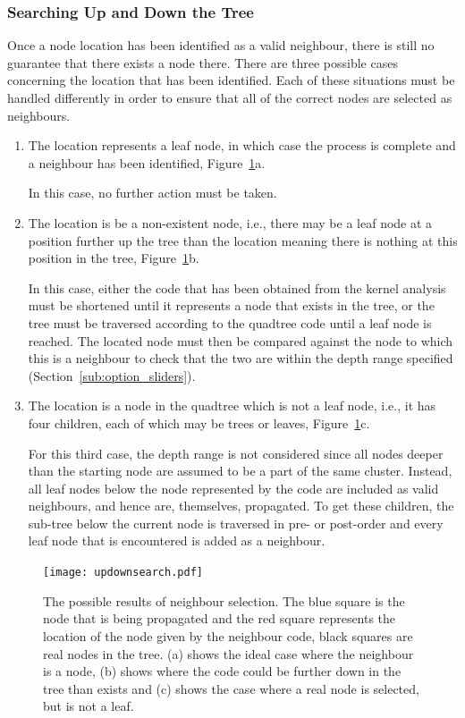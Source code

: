 \subsubsection{Searching Up and Down the Tree}
\label{ssub:Searching Up and Down the Tree}

Once a node location has been identified as a valid neighbour, there is still
no guarantee that there exists a node there. There are three possible cases
concerning the location that has been identified. Each of these situations must
be handled differently in order to ensure that all of the correct nodes are
selected as neighbours.

\begin{enumerate}
	\item The location represents a leaf node, in which case the process is
		complete and a neighbour has been identified,
		Figure~\ref{fig:updownsearch}a.

		In this case, no further action must be taken.

	\item The location is be a non-existent node, i.e., there may be a leaf
		node at a position further up the tree than the location meaning there
		is nothing at this position in the tree,
		Figure~\ref{fig:updownsearch}b.

		In this case, either the code that has been obtained from the kernel
		analysis must be shortened until it represents a node that exists in
		the tree, or the tree must be traversed according to the quadtree code
		until a leaf node is reached. The located node must then be compared
		against the node to which this is a neighbour to check that the two are
		within the depth range specified (Section~\ref{sub:option_sliders}).

	\item The location is a node in the quadtree which is not a leaf node,
		i.e., it has four children, each of which may be trees or leaves,
		Figure~\ref{fig:updownsearch}c.

		For this third case, the depth range is not considered since all nodes
		deeper than the starting node are assumed to be a part of the same
		cluster. Instead, all leaf nodes below the node represented by the code
		are included as valid neighbours, and hence are, themselves,
		propagated. To get these children, the sub-tree below the current node
		is traversed in pre- or post-order and every leaf node that is
		encountered is added as a neighbour.

\end{enumerate}

\begin{figure}[tbhp]
	\centering
	\texttt{[image: updownsearch.pdf]}
	\caption[Possible results of neighbour selection.]{The possible results of
		neighbour selection. The blue square is the node that is being
		propagated and the red square represents the location of the node given
		by the neighbour code, black squares are real nodes in the tree. (a)
		shows the ideal case where the neighbour is a node, (b) shows where the
		code could be further down in the tree than exists and (c) shows the
		case where a real node is selected, but is not a leaf.}\label{fig:updownsearch}
\end{figure}
